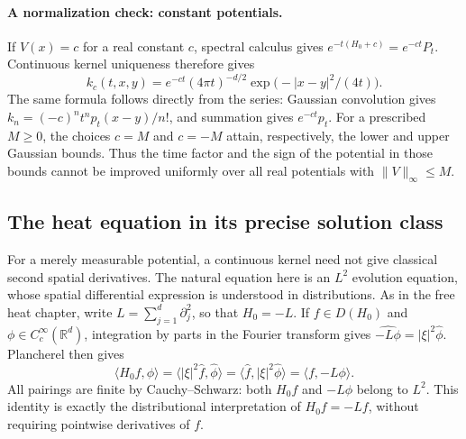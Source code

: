 \paragraph{A normalization check: constant potentials.}
If $V(x)=c$ for a real constant $c$, spectral calculus gives
$e^{-t(H_0+c)}=e^{-ct}P_t$. Continuous kernel uniqueness therefore gives
\[
k_c(t,x,y)=e^{-ct}(4\pi t)^{-d/2}
                     \exp\bigl(-|x-y|^2/(4t)\bigr).
\]
The same formula follows directly from the series: Gaussian convolution
gives $k_n=(-c)^nt^np_t(x-y)/n!$, and summation gives $e^{-ct}p_t$.
For a prescribed $M\geq0$, the choices $c=M$ and $c=-M$ attain,
respectively, the lower and upper Gaussian bounds. Thus the time factor
and the sign of the potential in those bounds cannot be improved
uniformly over all real potentials with $\|V\|_\infty\leq M$.

\subsection{The heat equation in its precise solution class}
For a merely measurable potential, a continuous kernel need not give
classical second spatial derivatives. The natural equation here is an
$L^2$ evolution equation, whose spatial differential expression is
understood in distributions. As in the free heat chapter, write
$L=\sum_{j=1}^d\partial_j^2$, so that $H_0=-L$.
If $f\in D(H_0)$ and $\phi\in C_c^\infty(\mathbb R^d)$, integration
by parts in the Fourier transform gives
$\widehat{-L\phi}=|\xi|^2\widehat\phi$. Plancherel then gives
\[
\langle H_0f,\phi\rangle
=\langle |\xi|^2\widehat f,\widehat\phi\rangle
=\langle\widehat f,|\xi|^2\widehat\phi\rangle
=\langle f,-L\phi\rangle.
\]
All pairings are finite by Cauchy--Schwarz: both $H_0f$ and
$-L\phi$ belong to $L^2$. This identity is exactly the
distributional interpretation of $H_0f=-L f$, without requiring
pointwise derivatives of $f$.

